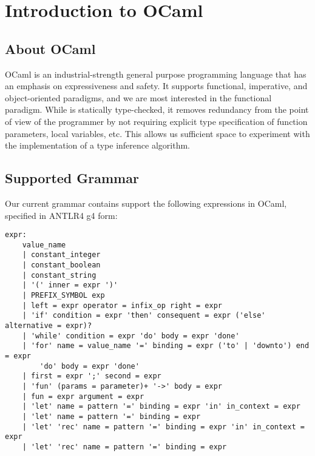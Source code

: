 \section{Introduction to OCaml}

\subsection{About OCaml}
OCaml is an industrial-strength general purpose programming language that has an emphasis on expressiveness and safety. It supports functional, imperative, and object-oriented paradigms, and we are most interested in the functional paradigm. While is statically type-checked, it removes redundancy from the point of view of the programmer by not requiring explicit type specification of function parameters, local variables, etc. This allows us sufficient space to experiment with the implementation of a type inference algorithm.
  
\subsection{Supported Grammar}
Our current grammar contains support the following expressions in OCaml, specified in ANTLR4 g4 form:

\footnotesize
\begin{Verbatim}[tabsize=4]
expr:
	value_name
	| constant_integer	
	| constant_boolean		
	| constant_string	
	| '(' inner = expr ')'
	| PREFIX_SYMBOL exp
	| left = expr operator = infix_op right = expr	
	| 'if' condition = expr 'then' consequent = expr ('else' alternative = expr)?
	| 'while' condition = expr 'do' body = expr 'done'
	| 'for' name = value_name '=' binding = expr ('to' | 'downto') end = expr 
        'do' body = expr 'done'
	| first = expr ';' second = expr
	| 'fun' (params = parameter)+ '->' body = expr	
	| fun = expr argument = expr
	| 'let' name = pattern '=' binding = expr 'in' in_context = expr
	| 'let' name = pattern '=' binding = expr
	| 'let' 'rec' name = pattern '=' binding = expr 'in' in_context = expr
	| 'let' 'rec' name = pattern '=' binding = expr	
\end{Verbatim}
\normalsize